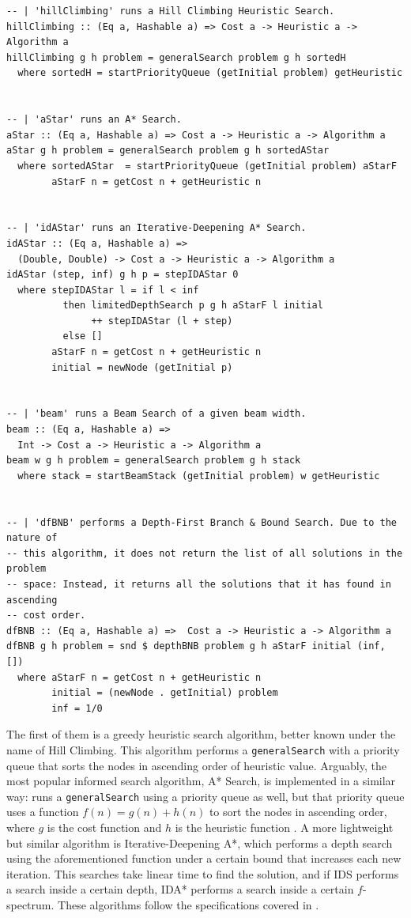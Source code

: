 \begin{lstlisting}[style=haskell, caption=Pure informed search algorithms,
label=pure:inf]
-- | 'hillClimbing' runs a Hill Climbing Heuristic Search.
hillClimbing :: (Eq a, Hashable a) => Cost a -> Heuristic a -> Algorithm a
hillClimbing g h problem = generalSearch problem g h sortedH
  where sortedH = startPriorityQueue (getInitial problem) getHeuristic


-- | 'aStar' runs an A* Search.
aStar :: (Eq a, Hashable a) => Cost a -> Heuristic a -> Algorithm a
aStar g h problem = generalSearch problem g h sortedAStar
  where sortedAStar  = startPriorityQueue (getInitial problem) aStarF
        aStarF n = getCost n + getHeuristic n


-- | 'idAStar' runs an Iterative-Deepening A* Search.
idAStar :: (Eq a, Hashable a) =>
  (Double, Double) -> Cost a -> Heuristic a -> Algorithm a
idAStar (step, inf) g h p = stepIDAStar 0
  where stepIDAStar l = if l < inf
          then limitedDepthSearch p g h aStarF l initial
               ++ stepIDAStar (l + step)
          else []
        aStarF n = getCost n + getHeuristic n
        initial = newNode (getInitial p)


-- | 'beam' runs a Beam Search of a given beam width.
beam :: (Eq a, Hashable a) =>
  Int -> Cost a -> Heuristic a -> Algorithm a
beam w g h problem = generalSearch problem g h stack
  where stack = startBeamStack (getInitial problem) w getHeuristic


-- | 'dfBNB' performs a Depth-First Branch & Bound Search. Due to the nature of
-- this algorithm, it does not return the list of all solutions in the problem
-- space: Instead, it returns all the solutions that it has found in ascending
-- cost order.
dfBNB :: (Eq a, Hashable a) =>  Cost a -> Heuristic a -> Algorithm a
dfBNB g h problem = snd $ depthBNB problem g h aStarF initial (inf, [])
  where aStarF n = getCost n + getHeuristic n
        initial = (newNode . getInitial) problem
        inf = 1/0
\end{lstlisting}


The first of them is a greedy heuristic search algorithm, better known under
the name of Hill Climbing. This algorithm performs a \texttt{generalSearch}
with a priority queue that sorts the nodes in ascending order of heuristic
value. Arguably, the most popular informed search algorithm, A* Search, is
implemented in a similar way: runs a \texttt{generalSearch} using a priority
queue as well, but that priority queue uses a function $f(n) = g(n) +
h(n)$ to sort the nodes in ascending order, where $g$ is the cost function and
$h$ is the heuristic function \cite{dechter-1985-astar}. A more lightweight but
similar algorithm is Iterative-Deepening A*, which performs a depth search
using the aforementioned function under a certain bound that increases each new
iteration. This searches take linear time to find the solution, and if IDS
performs a search inside a certain depth, IDA* performs a search inside a
certain $f$-spectrum. These algorithms follow the specifications covered in
\cite{rusell-2003-aima}.\\

